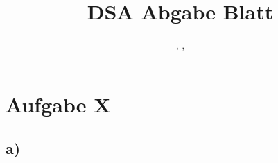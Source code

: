 \documentclass{scrartcl}
\title{DSA Abgabe Blatt \workSheet}
\author{\anton, \jannik, \omid}
\date{\dateOfFinishing }
\begin{document}
	\maketitle
	\newpage

	\section*{Aufgabe X}
	\subsection*{a)}





\end{document}
